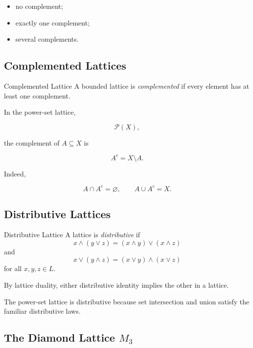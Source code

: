 \begin{itemize}
    \item no complement;
    \item exactly one complement;
    \item several complements.
\end{itemize}

\subsection{Complemented Lattices}
\label{subsec:complemented-lattices}

\begin{definitionbox}{Complemented Lattice}
A bounded lattice is \emph{complemented} if every element has at least one
complement.
\end{definitionbox}

In the power-set lattice,

\[ \mathcal P(X), \]

the complement of \(A\subseteq X\) is

\[ A^c=X\setminus A. \]

Indeed,

\[ A\cap A^c=\varnothing, \qquad A\cup A^c=X. \]

\subsection{Distributive Lattices}
\label{subsec:distributive-lattices}

\begin{definitionbox}{Distributive Lattice}
A lattice is \emph{distributive} if
\[ x\wedge(y\vee z)
=(x\wedge y)\vee(x\wedge z) \]
and
\[ x\vee(y\wedge z)
=(x\vee y)\wedge(x\vee z) \]
for all \(x,y,z\in L\).
\end{definitionbox}

By lattice duality, either distributive identity implies the other in a
lattice.

The power-set lattice is distributive because set intersection and union
satisfy the familiar distributive laws.

\subsection{The Diamond Lattice \(M_3\)}
\label{subsec:diamond-lattice}

